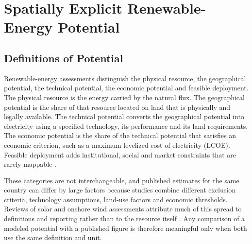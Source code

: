 
\section{Spatially Explicit Renewable-Energy Potential}
\label{sec:renewable_potential_foundations}

\subsection{Definitions of Potential}
\label{subsec:potential_definitions}

Renewable-energy assessments distinguish the physical resource, the
geographical potential, the technical potential, the economic potential
and feasible deployment. The physical resource is the energy carried by
the natural flux. The geographical potential is the share of that
resource located on land that is physically and legally available.
The technical potential converts the geographical potential into
electricity using a specified technology, its performance and its
land requirements. The economic potential is the share of the technical
potential that satisfies an economic criterion, such as a maximum
levelized cost of electricity (LCOE). Feasible deployment adds
institutional, social and market constraints that are rarely mappable
\cite{heinrichs2026,mckenna2022,turkovska2024}.

These categories are not interchangeable, and published estimates for
the same country can differ by large factors because studies combine
different exclusion criteria, technology assumptions, land-use factors
and economic thresholds. Reviews of solar and onshore wind assessments
attribute much of this spread to definitions and reporting rather than
to the resource itself \cite{mckenna2022,turkovska2024}. Any comparison
of a modeled potential with a published figure is therefore meaningful
only when both use the same definition and unit.

